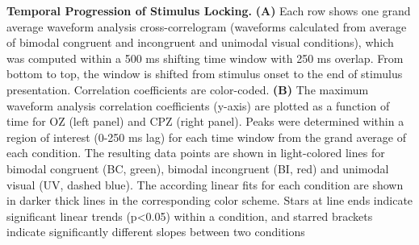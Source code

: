 \textbf{Temporal Progression of Stimulus Locking.} \textbf{(A)} Each row shows one grand
average waveform analysis cross-correlogram (waveforms calculated from
average of bimodal congruent and incongruent and unimodal visual
conditions), which was computed within a 500 ms shifting time window with
250 ms overlap. From bottom to top, the window is shifted from stimulus
onset to the end of stimulus presentation. Correlation coefficients are
color-coded. \textbf{(B)} The maximum waveform analysis correlation
coefficients (y-axis) are plotted as a function of time for OZ (left panel)
and CPZ (right panel). Peaks were determined within a region of interest
(0-250 ms lag) for each time window from the grand average of each
condition. The resulting data points are shown in light-colored lines for
bimodal congruent (BC, green), bimodal incongruent (BI, red) and unimodal
visual (UV, dashed blue). The according linear fits for each condition are
shown in darker thick lines in the corresponding color scheme. Stars at
line ends indicate significant linear trends (p\textless0.05) within a
condition, and starred brackets indicate significantly different slopes
between two conditions
